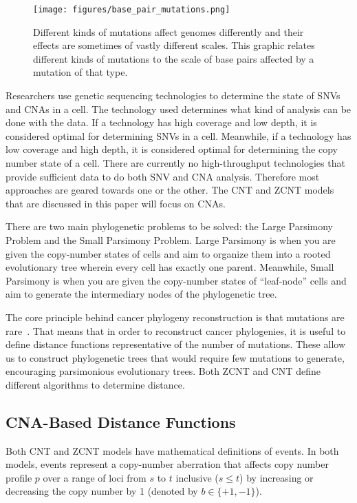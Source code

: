 \begin{figure}[ht]\label{fig:mutation_freq}
    \centering
    \texttt{[image: figures/base\_pair\_mutations.png]}
    \caption{Different kinds of mutations affect genomes differently and their effects are sometimes of vastly different scales. This graphic relates different kinds of mutations to the scale of base pairs affected by a mutation of that type.~\cite{lecture_2}}
\end{figure}

Researchers use genetic sequencing technologies to determine the state of SNVs and CNAs in a cell. The technology used determines what kind of analysis can be done with the data. If a technology has high coverage and low depth, it is considered optimal for determining SNVs in a cell. Meanwhile, if a technology has low coverage and high depth, it is considered optimal for determining the copy number state of a cell. There are currently no high-throughput technologies that provide sufficient data to do both SNV and CNA analysis. Therefore most approaches are geared towards one or the other. The CNT and ZCNT models that are discussed in this paper will focus on CNAs. 

There are two main phylogenetic problems to be solved: the Large Parsimony Problem and the Small Parsimony Problem. Large Parsimony is when you are given the copy-number states of cells and aim to organize them into a rooted evolutionary tree wherein every cell has exactly one parent. Meanwhile, Small Parsimony is when you are given the copy-number states of ``leaf-node'' cells and aim to generate the intermediary nodes of the phylogenetic tree. 

The core principle behind cancer phylogeny reconstruction is that mutations are rare~\cite{mutations_rare}. That means that in order to reconstruct cancer phylogenies, it is useful to define distance functions representative of the number of mutations. These allow us to construct phylogenetic trees that would require few mutations to generate, encouraging parsimonious evolutionary trees. Both ZCNT and CNT define different algorithms to determine distance. 

\subsection{CNA-Based Distance Functions}

Both CNT and ZCNT models have mathematical definitions of events. In both models, events represent a copy-number aberration that affects copy number profile $p$ over a range of loci from $s$ to $t$ inclusive ($s \leq t$) by increasing or decreasing the copy number by 1 (denoted by $b \in \{+1, -1\}$). 

